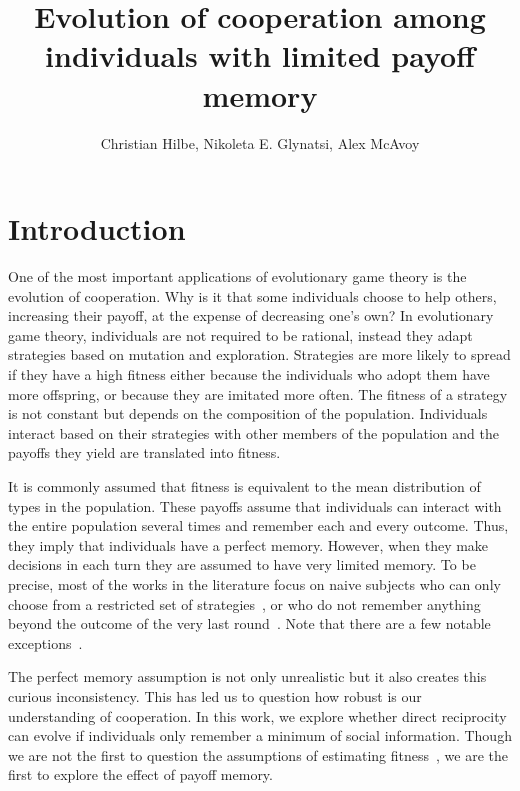 \documentclass[11pt]{article}
\title{
\bf  \sffamily \LARGE Evolution of cooperation among individuals with limited payoff memory\\}
\date{}
\author{Christian Hilbe, Nikoleta E. Glynatsi, Alex McAvoy}
\theoremstyle{plainCl1}
\theoremstyle{plainCl2}
\begin{document}
\maketitle

\begin{abstract}

\end{abstract}

\section{Introduction}

One of the most important applications of evolutionary game theory is the
evolution of cooperation. Why is it that some individuals choose to help others,
increasing their payoff, at the expense of decreasing one’s own? In evolutionary
game theory, individuals are not required to be rational, instead they adapt
strategies based on mutation and exploration. Strategies are more likely to
spread if they have a high fitness either because the individuals who adopt them
have more offspring, or because they are imitated more often. The fitness of a
strategy is not constant but depends on the composition of the population.
Individuals interact based on their strategies with other members of the
population and the payoffs they yield are translated into fitness.

It is commonly assumed that fitness is equivalent to the mean distribution of
types in the population. These payoffs assume that individuals can interact with
the entire population several times and remember each and every outcome. Thus,
they imply that individuals have a perfect memory. However, when they make
decisions in each turn they are assumed to have very limited memory. To be
precise, most of the works in the literature focus on naive subjects who can
only choose from a restricted set of strategies~\cite{Nowak1992tit}, or who do
not remember anything beyond the outcome of the very last round~\cite{Baek2016}.
Note that there are a few notable exceptions~\cite{Hauert1997, Stewart2016}.

The perfect memory assumption is not only unrealistic but it also creates this
curious inconsistency. This has led us to question how robust is our
understanding of cooperation. In this work, we explore whether direct
reciprocity can evolve if individuals only remember a minimum of social
information. Though we are not the first to question the assumptions of
estimating fitness~\cite{Roca2006}, we are the first to explore the effect of
payoff memory.
\end{document}
